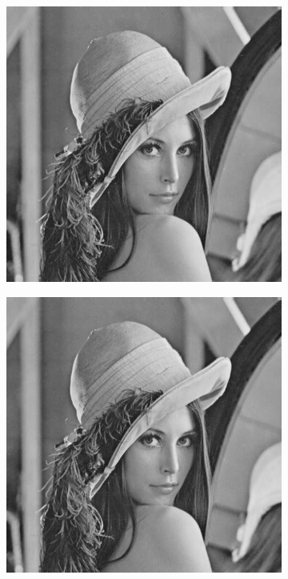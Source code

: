 \documentclass{article}
\begin{document}
\begin{figure}[htbp]
\begin{subfigure}{.19\textwidth}
    \end{subfigure}
    \begin{subfigure}{.19\textwidth}
        \includegraphics[width=\linewidth]{img/jpeg/60.jpg}
    \end{subfigure}
    \begin{subfigure}{.19\textwidth}
        \includegraphics[width=\linewidth]{img/jpeg/70.jpg}

\end{subfigure}
\end{figure}
\end{document}
